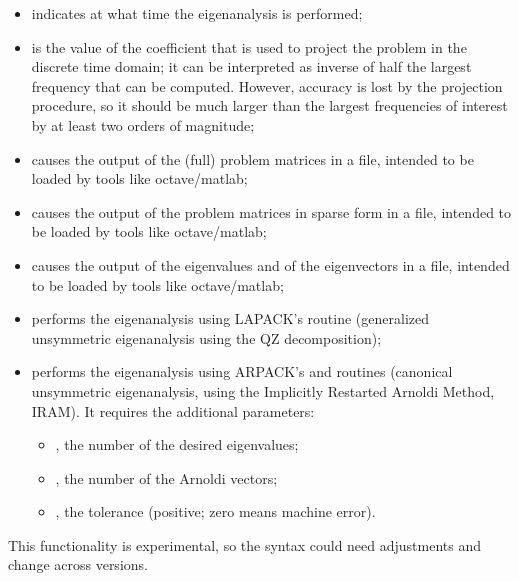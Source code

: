 \begin{itemize}
\item {} indicates at what time the eigenanalysis is performed;
\item {} is the value of the coefficient that is used to project
	the problem in the discrete time domain; it can be interpreted
	as inverse of half the largest frequency that can be computed.
	However, accuracy is lost by the projection procedure,
	so it should be much larger than the largest frequencies of interest
	by at least two orders of magnitude;
\item {} causes the output
	of the (full) problem matrices in a  file,
	intended to be loaded by tools like octave/matlab;
\item {} causes the output
	of the problem matrices in sparse form in a  file,
	intended to be loaded by tools like octave/matlab;
\item {} causes the output of the eigenvalues
	and of the eigenvectors in a  file,
	intended to be loaded by tools like octave/matlab;
\item {} performs the eigenanalysis using
	LAPACK's  routine (generalized unsymmetric eigenanalysis
	using the QZ decomposition);
\item {} performs the eigenanalysis using
	ARPACK's  and  routines
	(canonical unsymmetric eigenanalysis,
	using the Implicitly Restarted Arnoldi Method, IRAM).
	It requires the additional parameters:
	\begin{itemize}
	\item {}, the number of the desired eigenvalues;
	\item {}, the number of the Arnoldi vectors;
	\item {}, the tolerance (positive; zero means machine error).
	\end{itemize}
\end{itemize}
This functionality is experimental, so the syntax could need adjustments
and change across versions.



